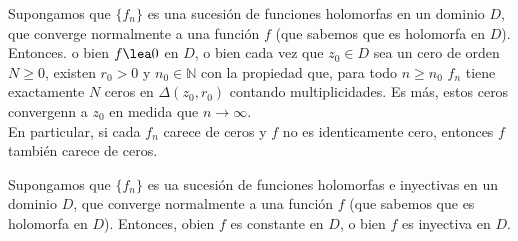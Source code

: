 \begin{teo}[De Hurwitz (I)]
Supongamos que $\{f_n\}$ es una sucesión de funciones holomorfas en un dominio $D$, que converge normalmente a una función $f$ (que sabemos que es holomorfa en $D$). Entonces. o bien $f \lea 0$ en $D$, o bien cada vez que $z_0 \in D$ sea un cero de orden $N \ge 0$, existen $r_0 > 0$ y $n_0 \in \mathbb{N}$ con la propiedad que, para todo $n \ge n_0$ $f_n$ tiene exactamente $N$ ceros en $\Delta(z_0,r_0)$ contando multiplicidades. Es más, estos ceros convergenn a  $z_0$ en medida que $n \to \infty$.
\\
\newline
En particular, si cada $f_n$ carece de ceros y $f$ no es identicamente cero, entonces $f$ también carece de ceros.
\end{teo}

\begin{teo}[De Hurwitz (II)]
Supongamos que $\{f_n\}$ es ua sucesión de funciones holomorfas e inyectivas en un dominio $D$, que converge normalmente a una función $f$ (que sabemos que es holomorfa en $D$). Entonces, obien $f$ es constante en $D$, o bien $f$ es inyectiva en $D$. 
\end{teo}